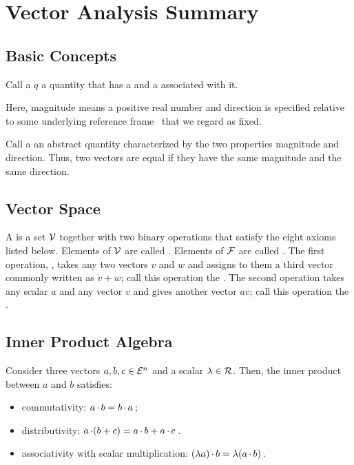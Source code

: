 \section{Vector Analysis Summary}

\subsection{Basic Concepts}
Call a  $q$ a quantity that has a  and a  associated with it. 

Here, magnitude means a positive real number and direction is specified relative to some underlying reference frame~ that we regard as fixed.

Call a  an abstract quantity characterized by the two properties magnitude and direction. Thus, two vectors are equal if they have the same magnitude and the same direction.


\subsection{Vector Space}
A  is a set $\mathcal{V}$ together with two binary operations that satisfy the eight axioms listed below. Elements of $\mathcal{V}$ are called . Elements of $\mathcal{F}$ are called . The first operation, , takes any two vectors $v$ and $w$ and assigns to them a third vector commonly written as $v + w$; call this operation the . The second operation takes any scalar $a$ and any vector $v$ and gives another vector $av$; call this operation the .


\subsection{Inner Product Algebra}
Consider three vectors $a,b,c\in\mathcal{E}^{n}$ and a scalar $\lambda\in\mathcal{R}$. Then, the inner product between $a$ and $b$ satisfies:
\begin{itemize}
\item commutativity: $a\operatorname{\cdot} b = b\operatorname{\cdot} a$\,;
\item distributivity: $a\operatorname{\cdot} (b + c) = a\operatorname{\cdot} b + a\operatorname{\cdot} c$\,.
\item associativity with scalar multiplication: $(\lambda a)\operatorname{\cdot} b = \lambda (a\operatorname{\cdot} b)$\,.
\end{itemize}


